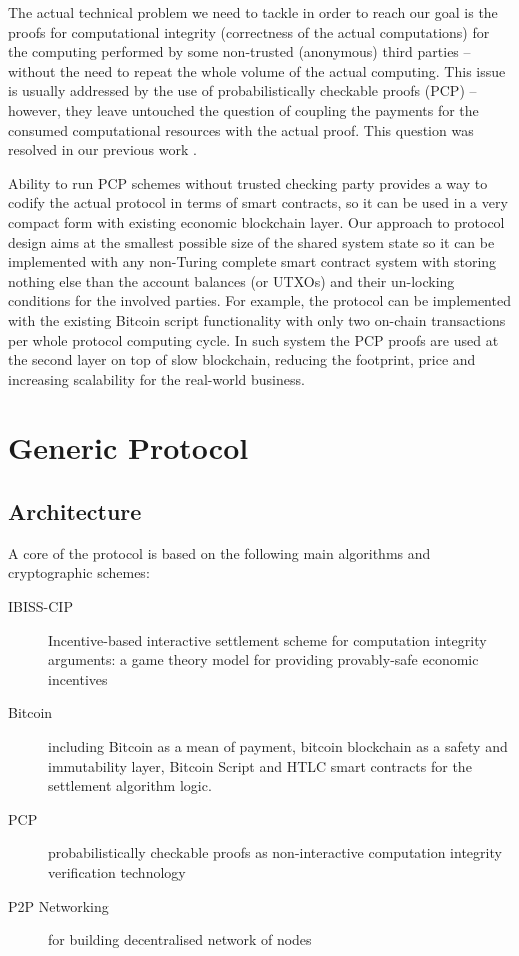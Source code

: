 \documentclass[a4paper]{article}
\begin{document}
The actual technical problem we need to tackle in order to reach our goal is the proofs for computational integrity (correctness of the actual computations) for the computing performed by some non-trusted (anonymous) third parties -- without the need to repeat the whole volume of the actual computing. This issue is usually addressed by the use of probabilistically checkable proofs (PCP) -- however, they leave untouched the question of coupling the payments for the consumed computational resources with the actual proof. This question was resolved in our previous work \cite{ibiss}. 

Ability to run PCP schemes without trusted checking party provides a way to codify the actual protocol in terms of smart contracts, so it can be used in a very compact form with existing economic blockchain layer. Our approach to protocol design aims at the smallest possible size of the shared system state so it can be implemented with any non-Turing complete smart contract system with storing nothing else than the account balances (or UTXOs) and their un-locking conditions for the involved parties. For example, the protocol can be implemented with the existing Bitcoin script functionality with only two on-chain transactions per whole protocol computing cycle. In such system the PCP proofs are used at the second layer on top of slow blockchain, reducing the footprint, price and increasing scalability for the real-world business.

\section{Generic Protocol}

\subsection{Architecture}
\label{architecture}
A core of the protocol is based on the following main algorithms and cryptographic schemes:
\begin{description}
    \item[IBISS-CIP] Incentive-based interactive settlement scheme for computation integrity arguments: a game theory model for providing provably-safe economic incentives \cite{ibiss}
    \item[Bitcoin] including Bitcoin as a mean of payment, bitcoin blockchain as a safety and immutability layer, Bitcoin Script and HTLC smart contracts for the settlement algorithm logic.
    \item[PCP] probabilistically checkable proofs \cite{pcp, pcpibm} as non-interactive computation integrity verification technology
    \item[P2P Networking] for building decentralised network of nodes
\end{description}
\end{document}
